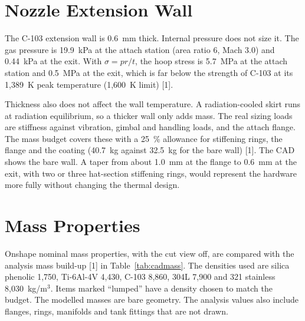\documentclass[10pt]{article}
\begin{document}
\section{Nozzle Extension Wall}
The C-103 extension wall is 0.6~mm thick. Internal pressure does not size it. The gas pressure is 19.9~kPa at the
attach station (area ratio 6, Mach 3.0) and 0.44~kPa at the exit. With $\sigma = p r / t$, the hoop stress is 5.7~MPa
at the attach station and 0.5~MPa at the exit, which is far below the strength of C-103 at its 1,389~K peak temperature
(1,600~K limit) [1].

Thickness also does not affect the wall temperature. A radiation-cooled skirt runs at radiation equilibrium, so a thicker
wall only adds mass. The real sizing loads are stiffness against vibration, gimbal and handling loads, and the attach
flange. The mass budget covers these with a 25~\% allowance for stiffening rings, the flange and the coating (40.7~kg
against 32.5~kg for the bare wall) [1]. The CAD shows the bare wall. A taper from about 1.0~mm at the flange to 0.6~mm at
the exit, with two or three hat-section stiffening rings, would represent the hardware more fully without changing the
thermal design.

\section{Mass Properties}
Onshape nominal mass properties, with the cut view off, are compared with the analysis mass build-up [1] in
Table~\ref{tab:cadmass}. The densities used are silica phenolic 1,750, Ti-6Al-4V 4,430, C-103 8,860, 304L 7,900 and
321 stainless 8,030~kg/m$^3$. Items marked ``lumped'' have a density chosen to match the budget. The modelled masses are
bare geometry. The analysis values also include flanges, rings, manifolds and tank fittings that are not drawn.
\end{document}
